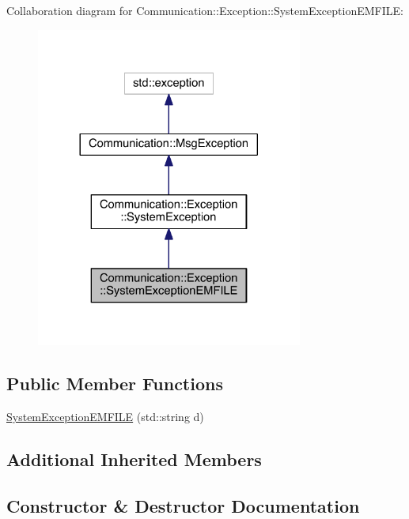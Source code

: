 Collaboration diagram for Communication\+:\+:Exception\+:\+:System\+Exception\+E\+M\+F\+I\+L\+E\+:\nopagebreak
\begin{figure}[H]
\begin{center}
\leavevmode
\includegraphics[width=248pt]{class_communication_1_1_exception_1_1_system_exception_e_m_f_i_l_e__coll__graph}
\end{center}
\end{figure}
\subsection*{Public Member Functions}
\begin{DoxyCompactItemize}
\item 
\hyperlink{class_communication_1_1_exception_1_1_system_exception_e_m_f_i_l_e_a560afecfc3ea34f2f9aec479329671f1}{System\+Exception\+E\+M\+F\+I\+L\+E} (std\+::string d)
\end{DoxyCompactItemize}
\subsection*{Additional Inherited Members}


\subsection{Constructor \& Destructor Documentation}
\hypertarget{class_communication_1_1_exception_1_1_system_exception_e_m_f_i_l_e_a560afecfc3ea34f2f9aec479329671f1}{}
